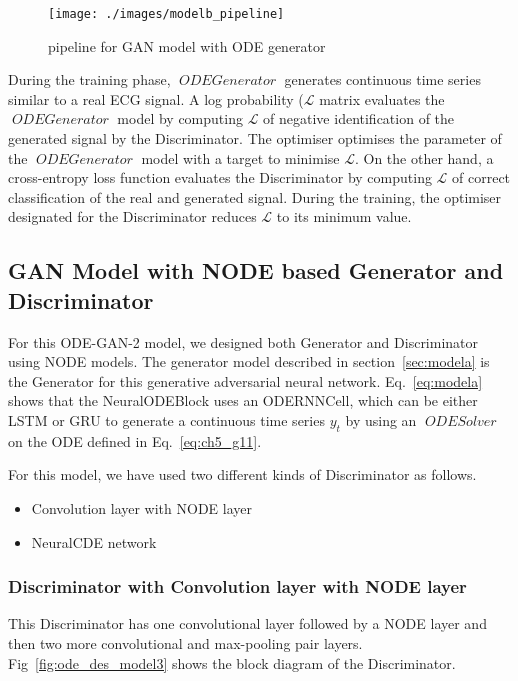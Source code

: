 \documentclass{article}
\DeclareMathOperator{\ODEGenerator}{\textit{ODEGenerator}}
\DeclareMathOperator{\ODESOLVER}{\textit{ODESolver}}
\begin{document}
\begin{figure}
    \centering
    \texttt{[image: ./images/modelb\_pipeline]}
    \caption{pipeline for GAN model with ODE generator}
    \label{fig:modelb_pipeline}
\end{figure}

During the training phase, $\ODEGenerator$ generates continuous time series similar to a real ECG signal. A log probability (\texorpdfstring{$\mathcal{L}$}) matrix evaluates the $\ODEGenerator$ model by computing $\mathcal{L}$ of negative identification of the generated signal by the  Discriminator. The optimiser optimises the parameter of the  $\ODEGenerator$ model with a target to minimise $\mathcal{L}$. On the other hand, a cross-entropy loss function evaluates the Discriminator by computing $\mathcal{L}$ of correct classification of the real and generated signal. During the training, the optimiser designated for the Discriminator reduces $\mathcal{L}$ to its minimum value.



\subsection{GAN Model with NODE based Generator and Discriminator}
\label{sec:modelc}
For this ODE-GAN-2 model, we designed both Generator and Discriminator using NODE models. The generator model described in section~\ref{sec:modela} is the Generator for this generative adversarial neural network. Eq.~\eqref{eq:modela} shows that the NeuralODEBlock uses an ODERNNCell, which can be either LSTM or GRU to generate a continuous time series $y_{t}$ by using an $\ODESOLVER$ on the ODE defined in Eq.~\eqref{eq:ch5_g11}. 


For this model, we have used two different kinds of Discriminator as follows.

\begin{itemize}
    \item Convolution layer with NODE layer
    \item NeuralCDE network  \cite{kidger2020neural}
\end{itemize}

\subsubsection{Discriminator with Convolution layer with NODE layer}

This Discriminator has one convolutional layer followed by a NODE layer and then two more convolutional and max-pooling pair layers.  Fig~\ref{fig:ode_des_model3} shows the block diagram of the Discriminator.
\end{document}

